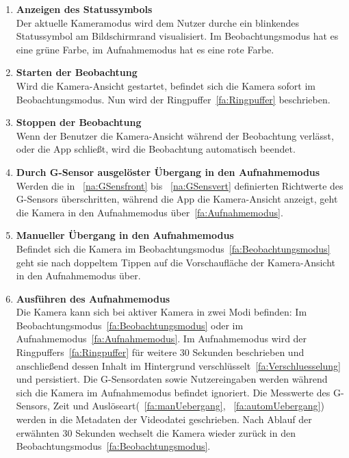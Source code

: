 \begin{enumerate}
\item \label{fa:Statussymbol}\textbf{Anzeigen des Statussymbols} \hfill \\
Der aktuelle Kameramodus wird dem Nutzer durche ein blinkendes Statussymbol am Bildschirmrand visualisiert. Im Beobachtungsmodus hat es eine grüne Farbe, im Aufnahmemodus hat es eine rote Farbe.

\item \label{fa:camStart}\textbf{Starten der Beobachtung} \hfill \\
Wird die Kamera-Ansicht gestartet, befindet sich die Kamera sofort im Beobachtungsmodus. Nun wird der Ringpuffer~\eqref{fa:Ringpuffer} beschrieben.

\item \textbf{Stoppen der Beobachtung} \hfill \\
Wenn der Benutzer die Kamera-Ansicht während der Beobachtung verlässt, oder die App schließt, wird die Beobachtung automatisch beendet.

\item \label{fa:automUebergang}\textbf{Durch G-Sensor ausgelöster Übergang in den Aufnahmemodus} \hfill \\
Werden die in ~\eqref{na:GSensfront} bis ~\eqref{na:GSensvert} definierten Richtwerte des G-Sensors überschritten, während die App die Kamera-Ansicht anzeigt, geht die Kamera in den Aufnahmemodus über~\eqref{fa:Aufnahmemodus}. 

\item \label{fa:manUebergang}\textbf{Manueller Übergang in den Aufnahmemodus} \hfill \\
Befindet sich die Kamera im Beobachtungsmodus~\eqref{fa:Beobachtungsmodus} geht sie nach doppeltem Tippen auf die Vorschaufläche der Kamera-Ansicht in den Aufnahmemodus über.

\item \label{fa:Aufnahmemodus}\textbf{Ausführen des Aufnahmemodus} \hfill \\
Die Kamera kann sich bei aktiver Kamera in zwei Modi befinden: Im Beobachtungsmodus~\eqref{fa:Beobachtungsmodus} oder im Aufnahmemodus~\eqref{fa:Aufnahmemodus}.
Im Aufnahmemodus wird der Ringpuffers~\eqref{fa:Ringpuffer} für weitere 30 Sekunden beschrieben und anschließend dessen Inhalt im Hintergrund verschlüsselt~\eqref{fa:Verschluesselung} und persistiert. Die G-Sensordaten sowie Nutzereingaben werden während sich die Kamera im Aufnahmemodus befindet ignoriert. Die Messwerte des G-Sensors, Zeit und Auslöseart(~\eqref{fa:manUebergang}, ~\eqref{fa:automUebergang}) werden in die Metadaten der Videodatei geschrieben. Nach Ablauf der erwähnten 30 Sekunden wechselt die Kamera wieder zurück in den Beobachtungsmodus~\eqref{fa:Beobachtungsmodus}.


\end{enumerate}
